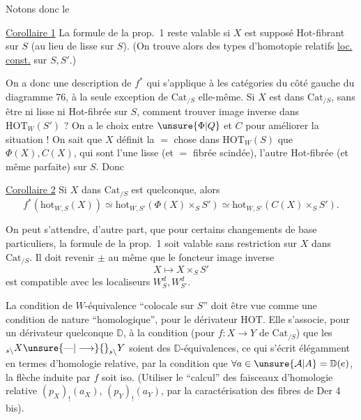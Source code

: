 Notons donc le

\uline{Corollaire 1} La formule de la prop.~1  reste valable si $X$ est supposé $\mathrm{Hot}$-fibrant sur $S$ (au lieu de lisse sur $S$). (On trouve alors des types d'homotopie relatifs \uline{loc. const.} sur $S,S'$.)

On a donc une description de $f^*$ qui s'applique à  les catégories du côté gauche
du diagramme 76, à la seule exception de $\mathrm{Cat}_{/S}$ elle-même. Si $X$ est dans $\mathrm{Cat}_{/S}$, sans être ni lisse ni Hot-fibrée sur $S$, comment trouver image inverse dans $\mathrm{HOT}_W(S')$ ? On a le choix entre $\unsure{\Phi|Q}$ et $C$ pour améliorer la situation ! On sait que $X$ définit la $=$ chose dans $\mathrm{HOT}_W(S)$ que $\Phi(X),C(X)$, qui sont l'une lisse (et $=$ fibrée scindée), l'autre Hot-fibrée (et même parfaite) sur $S$. Donc

\uline{Corollaire 2} Si $X$ dans $\mathrm{Cat}_{/S}$ est quelconque, alors
\[
f^*(\mathrm{hot}_{W,S}(X))\simeq\mathrm{hot}_{W,S'}(\Phi(X)\times_S S')\simeq\mathrm{hot}_{W,S'}(C(X)\times_S S').
\]

On peut s'attendre, d'autre part, que pour certains changements de base particuliers, la formule de la prop.~1 soit valable sans restriction sur $X$ dans $\mathrm{Cat}_{/S}$. Il doit revenir $\pm$ au même que le foncteur image inverse
\[
X\longmapsto X\times_S S'
\]
est compatible avec les localiseurs $W_S^d,W_{S'}^d$.

La  condition de $W$-équivalence ``colocale sur $S$'' doit être vue comme une condition de nature ``homologique'', pour le dérivateur $\mathrm{HOT}$. Elle s'associe, pour un dérivateur quelconque $\mathbb D$, à la condition (pour $f:X\longrightarrow Y$ de $\mathrm{Cat}_{/S}$) que  les $ {}_{s\backslash}X\unsure{\text{---}|\longrightarrow}{}_{s\backslash}Y$ soient des $\mathbb D$-équivalences,
ce qui s'écrit  élégamment en termes d'homologie relative, par la condition que $\forall a\in\unsure{\mathcal A|A}=\mathbb D(e)$, la flèche induite par $f$
soit iso. (Utiliser le ``calcul'' des faisceaux d'homologie relative $(p_X)_!(a_X)$, $(p_Y)_!(a_Y)$, par la caractérisation des fibres de Der 4 bis).

